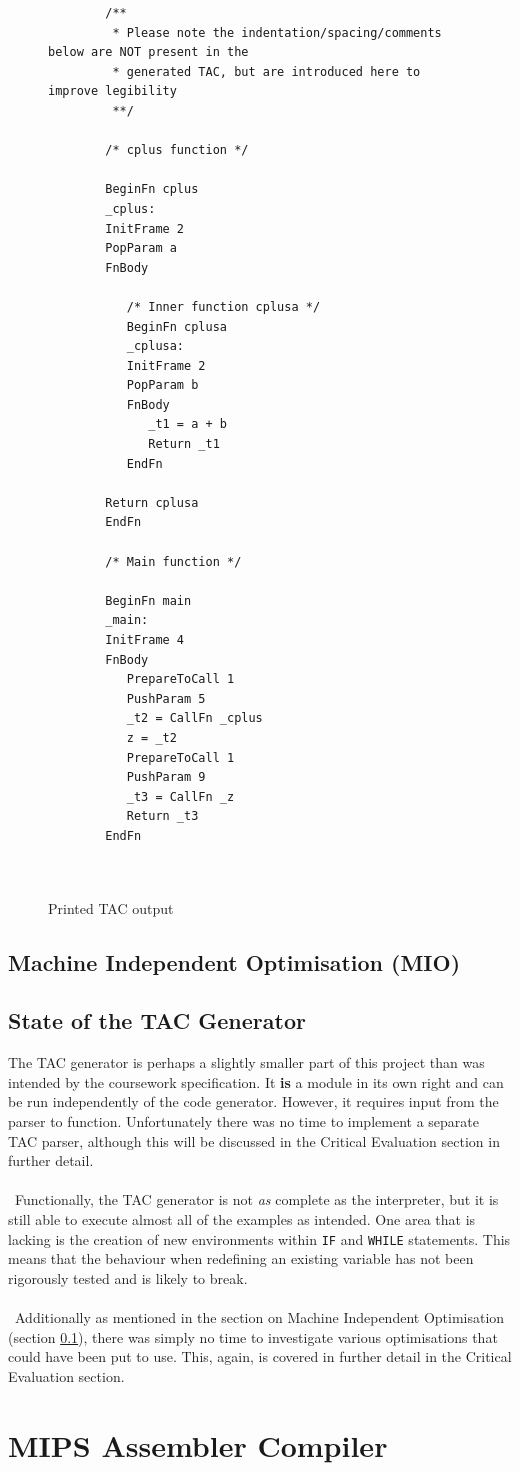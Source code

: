 \begin{figure}[p]
	\begin{verbatim}
		/** 
		 * Please note the indentation/spacing/comments below are NOT present in the
		 * generated TAC, but are introduced here to improve legibility
		 **/

		/* cplus function */
		
		BeginFn cplus
		_cplus:
		InitFrame 2
		PopParam a
		FnBody
		
		   /* Inner function cplusa */
		   BeginFn cplusa
		   _cplusa:
		   InitFrame 2
		   PopParam b
		   FnBody
		      _t1 = a + b
		      Return _t1
		   EndFn
		
		Return cplusa
		EndFn
		
		/* Main function */
		
		BeginFn main
		_main:
		InitFrame 4
		FnBody
		   PrepareToCall 1
		   PushParam 5
		   _t2 = CallFn _cplus
		   z = _t2
		   PrepareToCall 1
		   PushParam 9
		   _t3 = CallFn _z
		   Return _t3
		EndFn

		
	\end{verbatim}
	\caption{Printed TAC output}
	\label{fig:printedtac}
\end{figure}

\subsection{Machine Independent Optimisation (MIO)}
\label{sec:MIO}

\subsection{State of the TAC Generator}
The TAC generator is perhaps a slightly smaller part of this project than was intended by the coursework specification. It \textbf{is} a module in its own right and can be run independently of the code generator. However, it requires input from the parser to function. Unfortunately there was no time to implement a separate TAC parser, although this will be discussed in the Critical Evaluation section in further detail.
\\ \ \\ \
Functionally, the TAC generator is not \emph{as} complete as the interpreter, but it is still able to execute almost all of the examples as intended. One area that is lacking is the creation of new environments within \verb!IF! and \verb!WHILE! statements. This means that the behaviour when redefining an existing variable has not been rigorously tested and is likely to break.
\\ \ \\ \
Additionally as mentioned in the section on Machine Independent Optimisation (section \ref{sec:MIO}), there was simply no time to investigate various optimisations that could have been put to use. This, again, is covered in further detail in the Critical Evaluation section.
\section{MIPS Assembler Compiler}
\label{sec:MIPS}